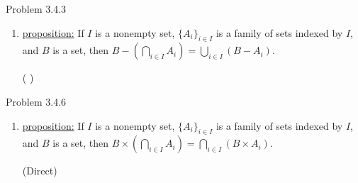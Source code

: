 \documentclass{article}
\theoremstyle{definition}
\begin{document}

\noindent Problem 3.4.3
\vspace{0.3cm}

\begin{enumerate}
\item[vi]

\underline{proposition:}
If $I$ is a nonempty set, $\{A_i\}_{i \in I}$ is a family of sets indexed by $I$, and $B$ is a set, then $B - (\bigcap_{i\in I} A_i) = \bigcup_{i\in I}(B - A_i)$.

\vspace{.3cm}

 ( )

\vspace{.2cm}
\end{enumerate}
\vspace{1cm}


\noindent Problem 3.4.6
\vspace{0.3cm}

\begin{enumerate}
\item[2]
\underline{proposition:}
If $I$ is a nonempty set, $\{A_i\}_{i \in I}$ is a family of sets indexed by $I$, and $B$ is a set, then $B\times(\bigcap_{i \in I} A_i) = \bigcap_{i \in I}(B \times A_i)$.

\vspace{.3cm}

 (Direct)



\vspace{.2cm}
\end{enumerate}
\vspace{1cm}

\end{document}
